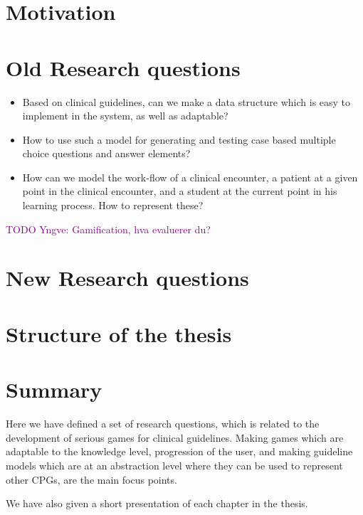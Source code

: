 
\section{Motivation}
\section{Old Research questions}
\begin{itemize}
	\item Based on clinical guidelines, can we make a data structure which is easy to implement in the system, as well as adaptable? 
	
	\item How to use such a model for generating and testing case based multiple choice questions and answer elements?
	
	
	\item How can we model the work-flow of a clinical encounter, a patient at a given point in the clinical encounter, and a student at the current point in his learning process. How to represent these?	
\end{itemize}

\textcolor{purple}{TODO Yngve: Gamification, hva evaluerer du?}


\section{New Research questions}

\section{Structure of the thesis}
\section{Summary}
Here we have defined a set of research questions, which is related to the development of serious games for clinical guidelines. Making games which are adaptable to the knowledge level, progression of the user, and making guideline models which are at an abstraction level where they can be used to represent other CPGs, are the main focus points.

We have also given a short presentation of each chapter in the thesis.

